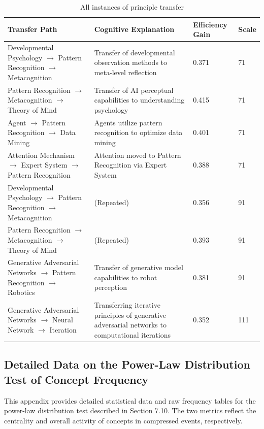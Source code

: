 \documentclass[10pt,onecolumn]{article}
\begin{document}
\begin{table}[H]
\centering
\caption{All instances of principle transfer}
\label{tab:app_migration_cases}
\setlength{\tabcolsep}{4pt}  %
\begin{tabular}{p{4cm}p{4.5cm}p{2cm}p{1cm}}
\toprule
\textbf{Transfer Path} & \textbf{Cognitive Explanation} & \textbf{Efficiency Gain} & \textbf{Scale} \\
\midrule
Developmental Psychology $\rightarrow$ Pattern Recognition $\rightarrow$ Metacognition & Transfer of developmental observation methods to meta-level reflection & 0.371 & 71 \\
Pattern Recognition $\rightarrow$ Metacognition $\rightarrow$ Theory of Mind & Transfer of AI perceptual capabilities to understanding psychology & 0.415 & 71 \\
Agent $\rightarrow$ Pattern Recognition $\rightarrow$ Data Mining & Agents utilize pattern recognition to optimize data mining & 0.401 & 71 \\
Attention Mechanism $\rightarrow$ Expert System $\rightarrow$ Pattern Recognition & Attention moved to Pattern Recognition via Expert System & 0.388 & 71 \\
Developmental Psychology $\rightarrow$ Pattern Recognition $\rightarrow$ Metacognition & (Repeated) & 0.356 & 91 \\
Pattern Recognition $\rightarrow$ Metacognition $\rightarrow$ Theory of Mind & (Repeated) & 0.393 & 91 \\
Generative Adversarial Networks $\rightarrow$ Pattern Recognition $\rightarrow$ Robotics & Transfer of generative model capabilities to robot perception & 0.381 & 91 \\
Generative Adversarial Networks $\rightarrow$ Neural Network $\rightarrow$ Iteration & Transferring iterative principles of generative adversarial networks to computational iterations & 0.352 & 111 \\
\bottomrule
\end{tabular}
\end{table}

\subsection{Detailed Data on the Power-Law Distribution Test of Concept Frequency}

This appendix provides detailed statistical data and raw frequency tables for the power-law distribution test described in Section 7.10. The two metrics reflect the centrality and overall activity of concepts in compressed events, respectively.
\end{document}
